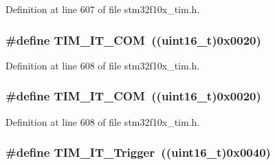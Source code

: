 Definition at line 607 of file stm32f10x\+\_\+tim.\+h.

\subsubsection[{\texorpdfstring{T\+I\+M\+\_\+\+I\+T\+\_\+\+C\+OM}{TIM_IT_COM}}]{\setlength{\rightskip}{0pt plus 5cm}\#define T\+I\+M\+\_\+\+I\+T\+\_\+\+C\+OM~(({\bf uint16\+\_\+t})0x0020)}\hypertarget{group___t_i_m__interrupt__sources_gaeb7eff6c39922814e7ee47c0820c3d9f}{}\label{group___t_i_m__interrupt__sources_gaeb7eff6c39922814e7ee47c0820c3d9f}


Definition at line 608 of file stm32f10x\+\_\+tim.\+h.

\subsubsection[{\texorpdfstring{T\+I\+M\+\_\+\+I\+T\+\_\+\+C\+OM}{TIM_IT_COM}}]{\setlength{\rightskip}{0pt plus 5cm}\#define T\+I\+M\+\_\+\+I\+T\+\_\+\+C\+OM~(({\bf uint16\+\_\+t})0x0020)}\hypertarget{group___t_i_m__interrupt__sources_gaeb7eff6c39922814e7ee47c0820c3d9f}{}\label{group___t_i_m__interrupt__sources_gaeb7eff6c39922814e7ee47c0820c3d9f}


Definition at line 608 of file stm32f10x\+\_\+tim.\+h.

\subsubsection[{\texorpdfstring{T\+I\+M\+\_\+\+I\+T\+\_\+\+Trigger}{TIM_IT_Trigger}}]{\setlength{\rightskip}{0pt plus 5cm}\#define T\+I\+M\+\_\+\+I\+T\+\_\+\+Trigger~(({\bf uint16\+\_\+t})0x0040)}\hypertarget{group___t_i_m__interrupt__sources_ga339629d21f2490729b28905f5c04bad1}{}\label{group___t_i_m__interrupt__sources_ga339629d21f2490729b28905f5c04bad1}


